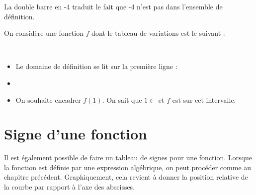 \begin{center}
\end{center}

La double barre en -4 traduit le fait que -4 n'est pas dans l'ensemble de définition.

\begin{Exemple}

On considère une fonction $f$ dont le tableau de variations est le suivant : \\
 \begin{minipage}[c]{.45\textwidth}
\begin{center}
\end{center}
\end{minipage} \hfill \begin{minipage}[c]{.5\textwidth}
$ $ \\
\begin{itemize}[label=\textcolor{Couleur10}{$\bullet$}]
    \item Le domaine de définition se lit sur la première ligne : \pointille{2cm}
    \item \ligne
    \item On souhaite encadrer $f(1)$. On sait que $1 \in$\pointille{2cm} et $f$ est \pointille{2cm} sur cet intervalle.
    \ligne
    
    \ligne
    
\end{itemize}
\end{minipage}

\end{Exemple}

\section{Signe d'une fonction}

\begin{Remarque}
Il est également possible de faire un tableau de signes pour une fonction. Lorsque la fonction est définie par une expression algébrique, on peut procéder comme au chapitre précédent. Graphiquement, cela revient à donner la position relative de la courbe par rapport à l'axe des abscisses.
\end{Remarque}

